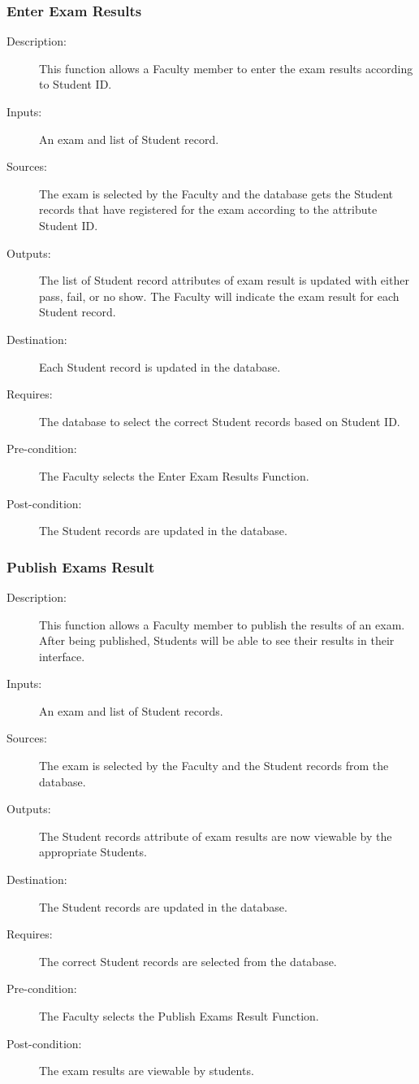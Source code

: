 \subsubsection{\large Enter Exam Results} 
\begin{boxed} %
\begin{description}
\item[Description:]
   This function allows a Faculty member to enter the exam results
   according to Student ID.
\item[Inputs:]
   An exam and list of Student record.
\item[Sources:]
   The exam is selected by the Faculty and the database gets the Student
   records that have registered for the exam according to the attribute
   Student ID.
\item[Outputs:]
   The list of Student record attributes of exam result is updated with
   either pass, fail, or no show. The Faculty will indicate the exam result for each
   Student record.
\item[Destination:]
   Each Student record is updated in the database.
\item[Requires:]
   The database to select the correct Student records based on Student ID.
\item[Pre-condition:]
   The Faculty selects the Enter Exam Results Function.
\item[Post-condition:]
   The Student records are updated in the database.
\end{description}
\end{boxed} %

\subsubsection{\large Publish Exams Result} 
\begin{boxed} %
\begin{description}
\item[Description:]
   This function allows a Faculty member to publish the results of an exam.
   After being published, Students will be able to see their results in their
   interface.
\item[Inputs:]
   An exam and list of Student records.
\item[Sources:]
   The exam is selected by the Faculty and the Student records 
   from the database.
\item[Outputs:]
   The Student records attribute of exam results are now viewable by the
   appropriate Students.
\item[Destination:]
   The Student records are updated in the database.
\item[Requires:]
   The correct Student records are selected from the database.
\item[Pre-condition:]
   The Faculty selects the Publish Exams Result Function.
\item[Post-condition:]
   The exam results are viewable by students.
\end{description}
\end{boxed} %

